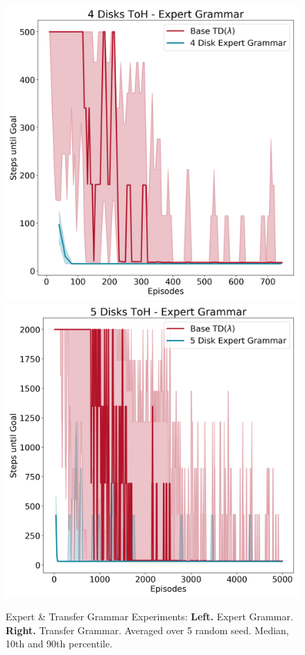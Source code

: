 \documentclass[10pt,letterpaper]{article}
\begin{document}
\begin{figure}[H]
  \includegraphics[width=\linewidth]{figures/4_disks_expert_grammar}
\endminipage\hfill
{}
  \includegraphics[width=\linewidth]{figures/5_disks_transfer_grammar}
\endminipage\hfill
\caption{Expert \& Transfer Grammar Experiments: \textbf{Left.} Expert Grammar. \textbf{Right.} Transfer Grammar. Averaged over 5 random seed. Median, 10th and 90th percentile.}
\label{fig:expert_grammar}
\end{figure}
\end{document}
